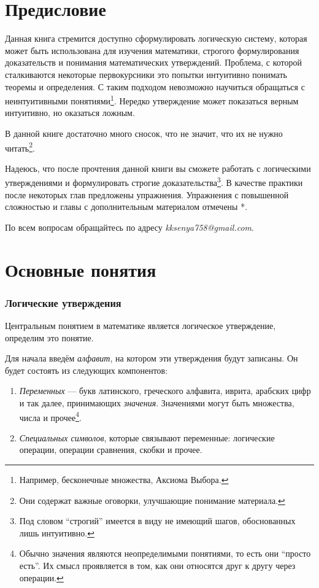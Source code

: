 \part{Предисловие}

Данная книга стремится доступно сформулировать логическую систему,
которая может быть использована для изучения математики, строгого
формулирования доказательств и понимания математических утверждений.
Проблема, с которой сталкиваются некоторые первокурсники это попытки
интуитивно понимать теоремы и определения. С таким подходом невозможно
научиться обращаться с неинтуитивными
понятиями\footnote{Например, бесконечные множества, Аксиома Выбора.}.
Нередко утверждение может показаться верным интуитивно,
но оказаться ложным.

В данной книге достаточно много сносок, что не значит, что их
не нужно читать\footnote{Они содержат важные оговорки,
	улучшающие понимание материала.}.

Надеюсь, что после прочтения данной книги вы сможете работать с логическими
утверждениями и формулировать строгие доказательства\footnote{Под словом ``строгий''
	имеется в виду не имеющий шагов, обоснованных лишь интуитивно.}. В качестве практики
после некоторых глав предложены упражнения. Упражнения с повышенной сложностью
и главы с дополнительным материалом отмечены *.

По всем вопросам обращайтесь по адресу {\sl kksenya758@gmail.com}.

\part{Основные понятия}

\section{Логические утверждения}

Центральным понятием в математике является логическое утверждение,
определим это понятие.

Для начала введём {\it алфавит}, на котором эти утверждения будут записаны.
Он будет состоять из следующих компонентов:
\begin{enumerate}
	\item{}{\it Переменных} --- букв латинского, греческого алфавита,
	иврита, арабских цифр и так далее, принимающих {\it значения}.
	Значениями могут быть множества, числа и прочее\footnote{Обычно значения
		являются неопределимыми понятиями, то есть они ``просто есть''. Их смысл
		проявляется в том, как они относятся друг к другу через операции.}.
	\item{}{\it Специальных символов}, которые связывают переменные:
	логические операции, операции сравнения, скобки и прочее.
\end{enumerate}

